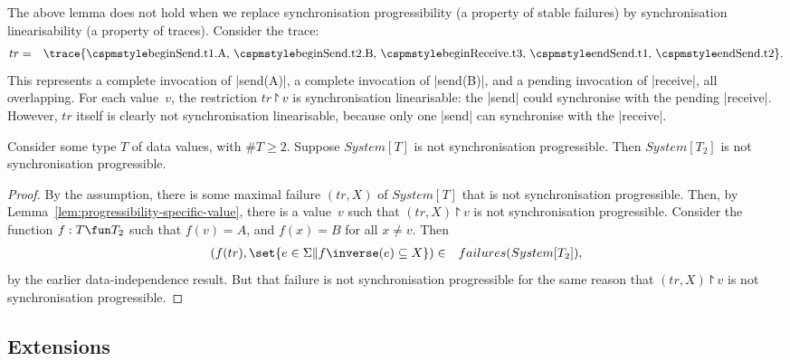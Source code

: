 \begin{note}
The above lemma does not hold when we replace synchronisation progressibility
(a property of stable failures) by synchronisation linearisability (a property
of traces).  Consider the trace:
\begin{eqnarray*}
tr &  =  &
  \trace{ \CSPMMR{beginSend.t1.A},\, \CSPMMR{beginSend.t2.B},\, 
    \CSPMMR{beginReceive.t3},\, \CSPMMR{endSend.t1},\, \CSPMMR{endSend.t2} }.
\end{eqnarray*}
This represents a complete invocation of |send(A)|, a complete invocation of
|send(B)|, and a pending invocation of |receive|, all overlapping.  For each
value~$v$, the restriction $tr \project v$ is synchronisation linearisable:
the |send| could synchronise with the pending |receive|.  However, $tr$ itself
is clearly not synchronisation linearisable, because only one |send| can
synchronise with the |receive|.
\end{note}


\begin{prop}
Consider some type $T$ of data values, with $\#T \ge 2$.  Suppose $System[T]$
is not synchronisation progressible.  Then $System[T_2]$ is not
synchronisation progressible.
\end{prop}

\begin{proof}
By the assumption, there is some maximal failure $(tr,X)$ of $System[T]$ that
is not synchronisation progressible.  Then, by
Lemma~\ref{lem:progressibility-specific-value}, there is a value~$v$ such that
$(tr,X) \project v$ is not synchronisation progressible.
%
Consider the function $f: T \fun T_2$ such that $f(v) = A$, and $f(x) = B$ for
all $x \ne v$.  Then 
\begin{eqnarray*}
(f(tr), \set{e \in \Sigma \| f\inverse(e) \subseteq X}) & \in &
   failures(System[T_2]),
\end{eqnarray*}
by the earlier data-independence result.  But that failure is not
synchronisation progressible for the same reason that $(tr,X) \project v$ is
not synchronisation progressible.
\end{proof}



\subsection{Extensions}
\label{sec:di-extensions}

